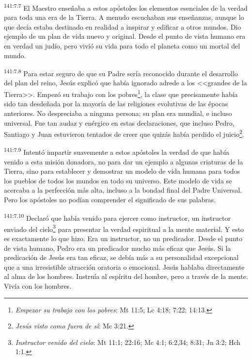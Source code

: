 \par 
\textsuperscript{141:7.7} El Maestro enseñaba a estos apóstoles los elementos esenciales de la verdad para toda una era de la Tierra. A menudo escuchaban sus enseñanzas, aunque lo que decía estaba destinado en realidad a inspirar y edificar a otros mundos. Dio ejemplo de un plan de vida nuevo y original. Desde el punto de vista humano era en verdad un judío, pero vivió su vida para todo el planeta como un mortal del mundo.

\par 
\textsuperscript{141:7.8} Para estar seguro de que su Padre sería reconocido durante el desarrollo del plan del reino, Jesús explicó que había ignorado adrede a los <<grandes de la Tierra>>. Empezó su trabajo con los pobres\footnote{\textit{Empezar su trabajo con los pobres}: Mt 11:5; Lc 4:18; 7:22; 14:13.}, la clase que precisamente había sido tan desdeñada por la mayoría de las religiones evolutivas de las épocas anteriores. No despreciaba a ninguna persona; su plan era mundial, e incluso universal. Fue tan audaz y enérgico en estas declaraciones, que incluso Pedro, Santiago y Juan estuvieron tentados de creer que quizás había perdido el juicio\footnote{\textit{Jesús visto como fuera de sí}: Mc 3:21.}.

\par 
\textsuperscript{141:7.9} Intentó impartir suavemente a estos apóstoles la verdad de que había venido a esta misión donadora, no para dar un ejemplo a algunas criaturas de la Tierra, sino para establecer y demostrar un modelo de vida humana para todos los pueblos de todos los mundos en todo su universo. Este modelo de vida se acercaba a la perfección más alta, incluso a la bondad final del Padre Universal. Pero los apóstoles no podían comprender el significado de sus palabras.

\par 
\textsuperscript{141:7.10} Declaró que había venido para ejercer como instructor, un instructor enviado del cielo\footnote{\textit{Instructor venido del cielo}: Mt 11:1; 22:16; Mc 4:1; 6:2,34; 8:31; Jn 3:2; Hch 1:1.} para presentar la verdad espiritual a la mente material. Y esto es exactamente lo que hizo. Era un instructor, no un predicador. Desde el punto de vista humano, Pedro era un predicador mucho más eficaz que Jesús. Si la predicación de Jesús era tan eficaz, se debía más a su personalidad excepcional que a una irresistible atracción oratoria o emocional. Jesús hablaba directamente al alma de los hombres. Instruía al espíritu del hombre, pero a través de la mente. Vivía con los hombres.

